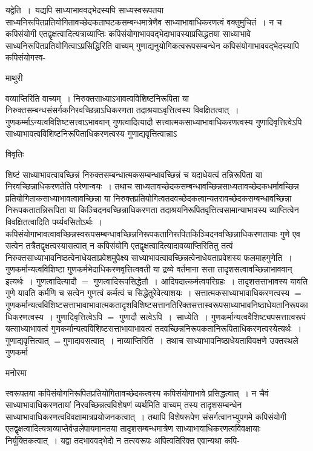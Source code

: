 \documentclass[10pt, openany]{book}
\begin{document}
{{\la यद्वेति~।}~यद्यपि साध्याभाववद्भेदस्यपि साध्यस्वरूपतया साध्यनिरूपितप्रतियोगितावच्छेदकताघटकसम्बन्धमात्रेणैव साध्याभावाधिकरणत्वं वक्तुमुचितं~। न च कपिसंयोगी एतद्वृक्षत्वादित्यत्राव्याप्तिः कपिसंयोगाभाववद्भेदाभावस्याप्रसिद्धतया साध्याभावे साध्यनिरूपितप्रतियोगित्वाऽप्रसिद्धिरिति वाच्यम् गुणाद्यनुयोगिकत्वरूपसम्बन्धेन
कपिसंयोगाभाववद्भेदस्यापि कपिसंयोगस्व-
\newpage
\begin{center}  माथुरी  \end{center}
{\la वव्याप्तिरिति वाच्यम्~। निरुक्तसाध्याऽभावत्वविशिष्टनिरूपिता या  निरुक्तसम्बन्धसंसर्गकनिरवच्छिन्नाऽधिकरणता तदाश्रयाऽवृत्तित्वस्य विवक्षितत्वात्~।   गुणकर्म्माऽन्यत्वविशिष्टसत्त्वाऽभाववान् गुणत्वादित्यादौ सत्त्वात्मकसाध्याभावाधिकरणत्वस्य गुणादिवृत्तित्वेऽपि साध्याभावत्वविशिष्टनिरूपिताधिकरणत्वस्य गुणाद्यवृत्तित्वान्नाऽ}
\begin{center}     विवृतिः \end{center}
शिष्टं साध्याभावत्वावच्छिन्नं निरुक्तसम्बन्धात्मकसम्बन्धावच्छिन्नं च यदाधेयत्वं तन्निरूपिता या निरवच्छिन्नाधिकरणतेति परेणान्वयः~। तथाच
साध्यतावच्छेदकसम्बन्धावच्छिन्नसाध्यतावच्छेदकधर्मावच्छिन्न प्रतियोगिताकसाध्याभावत्वावच्छिन्ना या निरुक्तप्रतियोगित्वतदवच्छेदकत्वान्यतरावच्छेदकसम्बन्धावच्छिन्ना
निरूपकतातन्निरूपिता या किञ्चिदनवच्छिन्नाधिकरणता तदाश्रयनिरूपितवृत्तित्वसामान्याभावस्य व्याप्तित्वेन विवक्षितत्वादिति पर्य्यवसितोऽर्थः~।कपिसंयोगाभावत्वावच्छिन्नस्वरूपसम्बन्धावच्छिन्ननिरूपकतानिरूपितकिञ्चिदनवच्छिन्नाधिकरणतायाः गुणे एव सत्वेन तत्रैतद्वृक्षत्वस्यासत्वात् न कपिसंयोगि
एतद्वृक्षत्वादित्यादावव्याप्तिरितितु तत्वं निरुक्तसाध्याभावनिष्ठत्वेनाधेयताप्रवेशमुपेक्ष्य साध्याभावत्वावच्छिन्नत्वेनाधेयताप्रवेशस्य फलमाह\textendash  गुणेति~। गुणकर्मान्यत्वविशिष्टा गुणकर्मभेदाधिकरणवृत्तित्ववती या द्रव्ये वर्तमाना सत्ता तादृशसत्वावच्छिन्नाभाववान् इत्यर्थः~। गुणत्वादित्यादौ $=$ गुणत्वादिरूपसिद्धेतौ~। आदिपदात्कर्मत्वपरिग्रहः~। तादृशसत्ताभावस्य यावति गुणे यावति कर्मणि च सत्वेन गुणत्वं कर्मत्वं च सिद्धेतुरेवेत्याशयः~। सत्तात्मकसाध्याभावाधिकरणत्वस्य $=$ गुणकर्मान्यत्वविशिष्टसत्ताभावाभावात्मकतादृशविशिष्टसत्तानतिरिक्तसत्तास्वरूपसाध्याभावनिष्ठाधेयतानिरूपकाधिकरणत्वस्य~। गुणादिवृत्तित्वेऽपि $=$ गुणादौ सत्वेऽपि~।~{\la साध्येति~।} गुणकर्मान्यत्ववैशिष्ट्यपसत्तात्वरूपं यत्साध्याभावत्वं गुणकर्मान्यत्वविशिष्टसत्ताभावाभावत्वं तदवच्छिन्ननिरूपकतानिरूपिताधिकरणत्वस्येत्यर्थः~। गुणाद्यवृत्तित्वात् $=$गुणादावसत्वात्~। {\la नाव्याप्तिरिति~।} तथाच साध्याभावनिष्ठाधेयताविवक्षणे उक्तस्थले गुणकर्मा\textendash
\begin{center}   मनोरमा  \end{center}
स्वरूपतया कपिसंयोगनिरूपितप्रतियोगितावच्छेदकत्वस्य कपिसंयोगाभावे प्रसिद्धत्वात्~। न चैवं साध्याभावाधिकरणतायां निरवच्छिन्नत्वविशेषणं व्यर्थमिति वाच्यम् तस्य
तादृशसम्बन्धेन साध्याभावाधिकरणत्वविवक्षामात्रप्रयोजनकत्वात्~। तथापि विशेषरूपेण संसर्गत्वानभ्युपगमे कपिसंयोगी एतद्वृक्षत्वादित्यत्राव्याप्तेर्वज्रलेपायमानतया
तादृशसम्बन्धमात्रेण साध्याभावाधिकरणत्वविवक्षायाः निर्युक्तिकत्वात्~। यद्वा तदभाववद्भेदो न तत्स्वरूपः अपित्वतिरिक्त एवान्यथा कपि-

}
\end{document}
